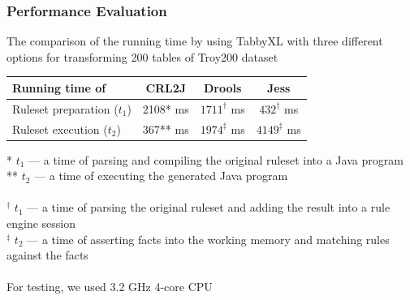\documentclass[10pt]{beamer}
\begin{document}
\begin{frame}
\frametitle{Performance Evaluation}
\small{The comparison of the running time by using TabbyXL with three different options for transforming 200 tables of Troy200 dataset \cite{Nagy2016}}
\begin{table}
		\centering
		    \bgroup
        \def\arraystretch{1.5}
				\begin{tabular}{|l|c|c|c|}
						\hline
									Running time of             & CRL2J   & Drools  & Jess     \\
						\hline
									Ruleset preparation ($t_1$) & 2108* ms & $1711^\dagger$ ms & $432^\dagger$  ms \\
                  Ruleset execution ($t_2$)   & 367** ms & $1974^\ddagger$ ms & $4149^\ddagger$ ms \\
			      \hline
		    \end{tabular}
				\egroup
\end{table}
\scriptsize{
* $t_1$ --- a time of parsing and compiling the original ruleset into a Java program \\
** $t_2$ --- a time of executing the generated Java program
\\~\\
$^\dagger$ $t_1$ --- a time of parsing the original ruleset and adding the result into a rule engine session \\
$^\ddagger$ $t_2$ --- a time of asserting facts into the working memory and matching rules against the facts
\\~\\
For testing, we used 3.2 GHz 4-core CPU
}
\end{frame}

\end{document}
